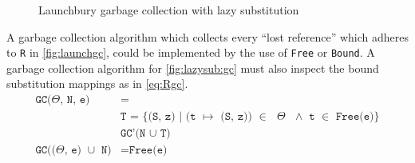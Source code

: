\documentclass[11pt,oneside,a4paper]{report}
\begin{document}
\begin{figure}[ht]
    \begin{mdframed}
          \begin{prooftree}
          \end{prooftree}   
    \end{mdframed}
    \caption{Launchbury garbage collection with lazy substitution}
    \label{fig:lazysub:gc}
\end{figure}

A garbage collection algorithm which collects every ``lost reference'' which adheres to \texttt{R} in \autoref{fig:launchgc}, could be implemented by the use of \texttt{Free} or \texttt{Bound}.
A garbage collection algorithm for \autoref{fig:lazysub:gc} must also inspect the bound substitution mappings as in \autoref{eq:Rgc}.
\begin{align}
  \texttt{GC($\Theta$, N, e)} &= \tag*{}\\
  &\texttt{T = \{(S, z) | (t $\mapsto$ (S, z)) $\in$ $\Theta$ $\land$ t $\in$ Free(e)\}}\tag*{}\\
  &\texttt{GC'(N $\cup$ T)}\tag*{}\\
  \texttt{GC(($\Theta$, e) $\cup$ N)} &= \texttt{Free(e)}
\end{align}
\begin{remark}
  
\end{remark}
\end{document}
